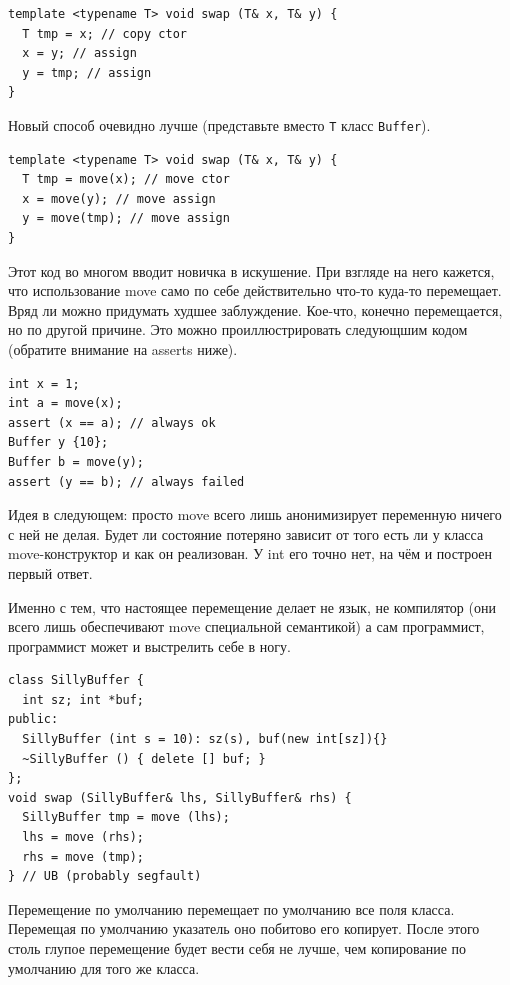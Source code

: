 \documentclass[a4paper,12pt,oneside]{book}
\begin{document}
\begin{lstlisting}
template <typename T> void swap (T& x, T& y) {
  T tmp = x; // copy ctor
  x = y; // assign
  y = tmp; // assign
} 
\end{lstlisting}

Новый способ очевидно лучше (представьте вместо \lstinline!T! класс \lstinline!Buffer!).

\begin{lstlisting}
template <typename T> void swap (T& x, T& y) {
  T tmp = move(x); // move ctor
  x = move(y); // move assign
  y = move(tmp); // move assign
} 
\end{lstlisting}

Этот код во многом вводит новичка в искушение. При взгляде на него кажется, что использование move само по себе действительно что-то куда-то перемещает. Вряд ли можно придумать худшее заблуждение. Кое-что, конечно перемещается, но по другой причине. Это можно проиллюстрировать следующшим кодом (обратите внимание на asserts ниже).

\begin{lstlisting}
int x = 1;
int a = move(x);
assert (x == a); // always ok
Buffer y {10};
Buffer b = move(y);
assert (y == b); // always failed
\end{lstlisting}

Идея в следующем: просто move всего лишь анонимизирует переменную ничего с ней не делая. Будет ли состояние потеряно зависит от того есть ли у класса move-конструктор и как он реализован. У int его точно нет, на чём и построен первый ответ.

Именно с тем, что настоящее перемещение делает не язык, не компилятор (они всего лишь обеспечивают move специальной семантикой) а сам программист, программист может и выстрелить себе в ногу.

\begin{lstlisting}
class SillyBuffer {
  int sz; int *buf;
public:
  SillyBuffer (int s = 10): sz(s), buf(new int[sz]){}
  ~SillyBuffer () { delete [] buf; }
};
void swap (SillyBuffer& lhs, SillyBuffer& rhs) {
  SillyBuffer tmp = move (lhs);
  lhs = move (rhs);
  rhs = move (tmp);
} // UB (probably segfault) 
\end{lstlisting}

Перемещение по умолчанию перемещает по умолчанию все поля класса. Перемещая по умолчанию указатель оно побитово его копирует. После этого столь глупое перемещение будет вести себя не лучше, чем копирование по умолчанию для того же класса.
\end{document}
